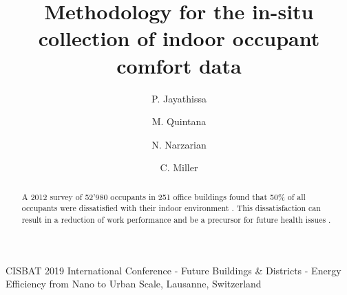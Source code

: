 \documentclass[preprint,11pt,3p]{elsarticle} %
\begin{document}
\begin{frontmatter}


\begin{center}
{CISBAT 2019 International Conference - Future Buildings \& Districts - Energy Efficiency from Nano to Urban Scale, Lausanne, Switzerland}
\end{center}

\title{Methodology for the in-situ collection of indoor occupant comfort data} 


\author[buds]{P. Jayathissa}
\address[buds]{Building and Urban Data Science Group,  Department of Building, Singapore} 

\author[buds]{M. Quintana}


\author[unsw]{N. Narzarian}
\address[unsw]{University of New South Wales, Australia}



\author[buds]{C. Miller  }




\begin{abstract}

A 2012 survey of 52'980 occupants in 251 office buildings found that 50\% of all occupants were dissatisfied with their indoor environment \cite{frontczak2012quantitative}. This dissatisfaction can result in a reduction of work performance \cite{wargocki2007effects} and be a precursor for future health issues \cite{jaakkola1989sick}. \\


\end{abstract}
\end{frontmatter}
\end{document}
